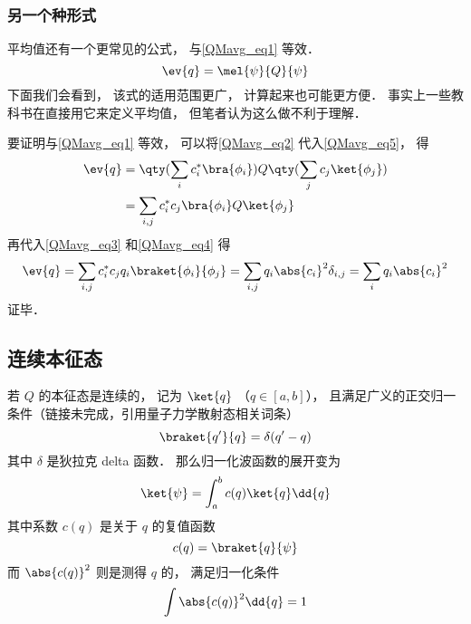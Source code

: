 \subsubsection{另一个种形式}
平均值还有一个更常见的公式， 与\autoref{QMavg_eq1} 等效．
\begin{equation}\label{QMavg_eq5}
\ev{q} = \mel{\psi}{Q}{\psi}
\end{equation}
下面我们会看到， 该式的适用范围更广， 计算起来也可能更方便． 事实上一些教科书在直接用它来定义平均值， 但笔者认为这么做不利于理解．

要证明与\autoref{QMavg_eq1} 等效， 可以将\autoref{QMavg_eq2} 代入\autoref{QMavg_eq5}， 得
\begin{equation}
\begin{aligned}
\ev{q} &= \qty(\sum_i c_i^* \bra{\phi_i}) Q \qty(\sum_j c_j \ket{\phi_j})\\
&= \sum_{i,j} c_i^* c_j \bra{\phi_i} Q \ket{\phi_j}
\end{aligned} 
\end{equation}
再代入\autoref{QMavg_eq3} 和\autoref{QMavg_eq4} 得
\begin{equation}
\ev{q} = \sum_{i,j} c_i^* c_j q_i \braket{\phi_i}{\phi_j}
= \sum_{i,j} q_i \abs{c_i}^2 \delta_{i,j} = \sum_i q_i \abs{c_i}^2
\end{equation}
证毕．

\subsection{连续本征态}

若 $Q$ 的本征态是连续的， 记为 $\ket{q}$ （$q\in [a,b]$）， 且满足广义的正交归一条件（链接未完成，引用量子力学散射态相关词条）
\begin{equation}\label{QMavg_eq9}
\braket{q'}{q} = \delta(q'-q)
\end{equation}
其中 $\delta$ 是狄拉克 delta 函数． 那么归一化波函数的展开变为
\begin{equation}\label{QMavg_eq7}
\ket{\psi} = \int_a^b c(q) \ket{q} \dd{q}
\end{equation}
其中系数 $c(q)$ 是关于 $q$ 的复值函数
\begin{equation}\label{QMavg_eq10}
c(q) = \braket{q}{\psi}
\end{equation}
而 $\abs{c(q)}^2$ 则是测得 $q$ 的， 满足归一化条件
\begin{equation}
\int \abs{c(q)}^2 \dd{q} = 1
\end{equation}

